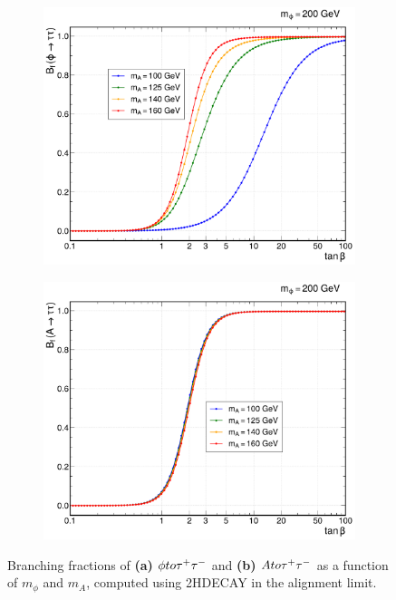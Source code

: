 \begin{figure}[!htbp]
        \centering
        \begin{subfigure}[b]{0.49\textwidth}
            \centering
            \includegraphics[width=\textwidth]{Figures/Chapter6/Phi_BR.pdf}
            \caption{}
        \end{subfigure}
        \begin{subfigure}[b]{0.49\textwidth}
            \centering
            \includegraphics[width=\textwidth]{Figures/Chapter6/A_BR.pdf}
            \caption{}
        \end{subfigure}
    \caption[Branching fractions of $\phi$ and $A$ to $\PGt^+\PGt^-$ for selected mass combinations.]{Branching fractions of \textbf{(a)} $\phi to \tau^+\tau^-$ and \textbf{(b)} $A to \tau^+\tau^-$ as a function of $m_\phi$ and $m_A$, computed using \textsc{2HDECAY} in the alignment limit.}
    \label{Figure:Chapter6_BranchingFractions}
\end{figure}

